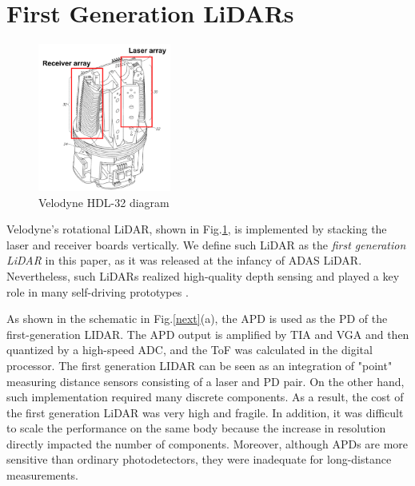 \documentclass[paper]{ieice}
\begin{document}
\section{First Generation LiDARs}
\begin{figure}[!t]
\centering
 \includegraphics[width=0.39\textwidth]{figs/velo.png}
  \caption{Velodyne HDL-32 diagram \cite{velopatent}}
\label{velo}
\end{figure}

\qquad Velodyne's rotational LiDAR\cite{velodyne, velopatent}, shown in Fig.\ref{velo}, is implemented by stacking the laser and receiver boards vertically.
We define such LiDAR as the \textit{first generation LiDAR} in this paper, as it was released at the infancy of ADAS LiDAR. Nevertheless, such LiDARs realized high-quality depth sensing and played a key role in many self-driving prototypes \cite{montemerlo2008junior}.

As shown in the schematic in Fig.\ref{next}(a), the APD is used as the PD of the first-generation LIDAR. The APD output is amplified by TIA and VGA and then quantized by a high-speed ADC, and the ToF was calculated in the digital processor.
The first generation LIDAR can be seen as an integration of "point" measuring distance sensors consisting of a laser and PD pair.
On the other hand, such implementation required many discrete components. As a result, the cost of the first generation LiDAR was very high and fragile. In addition, it was difficult to scale the performance on the same body because the increase in resolution directly impacted the number of components. Moreover, although APDs are more sensitive than ordinary photodetectors, they were inadequate for long-distance measurements.

\end{document}
